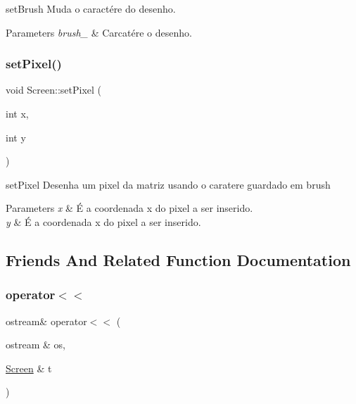 set\+Brush Muda o caractére do desenho. 


\begin{DoxyParams}{Parameters}
{\em brush\+\_\+} & Carcatére o desenho. \\
\hline
\end{DoxyParams}
\mbox{\label{class_screen_ae6bea81c57a22d226507c3c26fa95ee0}} 
\subsubsection{\texorpdfstring{set\+Pixel()}{setPixel()}}
{\footnotesize\ttfamily void Screen\+::set\+Pixel (\begin{DoxyParamCaption}\item[{int}]{x,  }\item[{int}]{y }\end{DoxyParamCaption})}



set\+Pixel Desenha um pixel da matriz usando o caratere guardado em \textquotesingle{}brush\textquotesingle{} 


\begin{DoxyParams}{Parameters}
{\em x} & É a coordenada \textquotesingle{}x\textquotesingle{} do pixel a ser inserido. \\
\hline
{\em y} & É a coordenada \textquotesingle{}x\textquotesingle{} do pixel a ser inserido. \\
\hline
\end{DoxyParams}


\subsection{Friends And Related Function Documentation}
\mbox{\label{class_screen_aab6a2880746bfe1b7964817cc8f0989e}} 
\subsubsection{\texorpdfstring{operator$<$$<$}{operator<<}}
{\footnotesize\ttfamily ostream\& operator$<$$<$ (\begin{DoxyParamCaption}\item[{ostream \&}]{os,  }\item[{\hyperlink{class_screen}{Screen} \&}]{t }\end{DoxyParamCaption})\hspace{0.3cm}{\ttfamily [friend]}}



